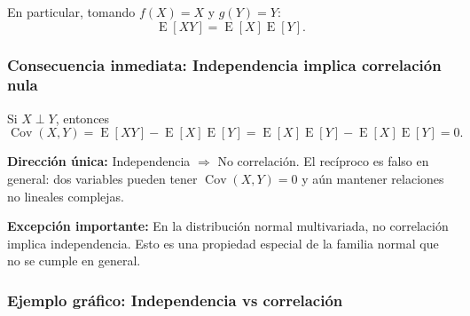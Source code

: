 \documentclass[11pt,a4paper]{article}
\DeclareMathOperator{\E}{E}
\DeclareMathOperator{\Cov}{Cov}
\begin{document}
En particular, tomando \(f(X)=X\) y \(g(Y)=Y\):
\[
\E[XY]=\E[X]\E[Y].
\]

\subsubsection*{Consecuencia inmediata: Independencia implica correlación nula}

Si \(X\perp Y\), entonces
\[
\Cov(X,Y)=\E[XY]-\E[X]\E[Y]=\E[X]\E[Y]-\E[X]\E[Y]=0.
\]

\begin{observacion}
\textbf{Dirección única:} Independencia \(\Rightarrow\) No correlación. El recíproco es falso en general: dos variables pueden tener \(\Cov(X,Y)=0\) y aún mantener relaciones no lineales complejas.

\vspace{0.3cm}
\noindent\textbf{Excepción importante:} En la distribución normal multivariada, no correlación implica independencia. Esto es una propiedad especial de la familia normal que no se cumple en general.
\end{observacion}

\subsubsection*{Ejemplo gráfico: Independencia vs correlación}
\end{document}
